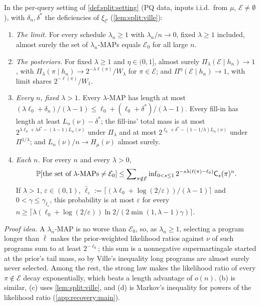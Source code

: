 \begin{theorem}\label{thm:recovery:main}
In the per-query setting of \cref{def:split:setting} (PQ data, inputs i.i.d.\ from $\mu$, $\mathcal E\ne\emptyset$), with $\delta_n,\delta^*$ the deficiencies of $\xi_{\mathcal C}$ (\cref{lem:split:ville}):
\begin{enumerate}[label=(\alph*),itemsep=0pt,topsep=2pt]
\item \emph{The limit.} For every schedule $\lambda_n\ge1$ with $\lambda_n/n\to0$, fixed $\lambda\ge1$ included, almost surely the set of $\lambda_n$-MAPs equals $\mathcal E_0$ for all large $n$.
\item \emph{The posteriors.} For fixed $\lambda\ge1$ and $\eta\in(0,1]$, almost surely $\Pi_\lambda(\mathcal E\mid h_n)\to1$, with $\Pi_\lambda(\pi\mid h_n)\to2^{-\lambda\ell(\pi)}/W_\lambda$ for $\pi\in\mathcal E$; and $\Pi^\eta(\mathcal E\mid h_n)\to1$, with limit shares $2^{-\ell(\pi)}/W_1$.
\item \emph{Every $n$, fixed $\lambda>1$.} Every $\lambda$-MAP has length at most $(\lambda\ell_0+\delta_n)/(\lambda-1)\le\ell_0+(\ell_0+\delta^*)/(\lambda-1)$. Every fill-in has length at least $L_n(\nu)-\delta^*$; the fill-ins' total mass is at most $2^{\lambda\ell_0+\lambda\delta^*-(\lambda-1)L_n(\nu)}$ under $\Pi_\lambda$ and at most $2^{\ell_0+\delta^*-(1-1/\lambda)L_n(\nu)}$ under $\Pi^{1/\lambda}$; and $L_n(\nu)/n\to H_\mu(\nu)$ almost surely.
\item \emph{Each $n$.} For every $n$ and every $\lambda>0$,
\[
\mathbb{P}[\text{the set of $\lambda$-MAPs}\ne\mathcal E_0]\le\sum\nolimits_{\pi\notin\mathcal E}\inf\nolimits_{0<s\le1}2^{-s\lambda(\ell(\pi)-\ell_0)}\mathsf C_s(\pi)^n .
\]
If $\lambda>1$, $\varepsilon\in(0,1)$, $\bar\ell_\varepsilon:=\lceil(\lambda\ell_0+\log(2/\varepsilon))/(\lambda-1)\rceil$ and $0<\gamma\le\gamma_{\bar\ell_\varepsilon}$, this probability is at most $\varepsilon$ for every $n\ge\big\lceil\lambda(\ell_0+\log(2/\varepsilon))\ln2/(2\min(1,\lambda-1)\gamma)\big\rceil$.
\end{enumerate}
\end{theorem}

\emph{Proof idea.} A $\lambda_n$-MAP is no worse than $\mathcal E_0$, so, as $\lambda_n\ge1$, selecting a program longer than $\bar\ell$ makes the prior-weighted likelihood ratios against $\nu$ of such programs sum to at least $2^{-\ell_0}$; this sum is a nonnegative supermartingale started at the prior's tail mass, so by Ville's inequality long programs are almost surely never selected. Among the rest, the strong law makes the likelihood ratio of every $\pi\notin\mathcal E$ decay exponentially, which beats a length advantage of $o(n)$. (b) is similar, (c) uses \cref{lem:split:ville}, and (d) is Markov's inequality for powers of the likelihood ratio (\cref{app:recovery:main}).

